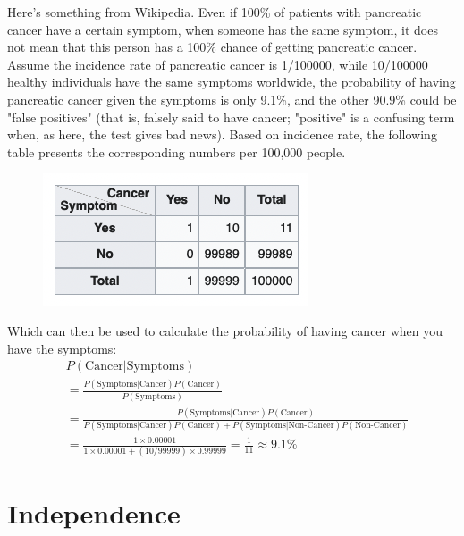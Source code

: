 \begin{example}
   Here's something from Wikipedia.
   Even if 100\% of patients with pancreatic cancer have a certain symptom, when someone has the same symptom, it does not mean that this person has a 100\% 
   chance of getting pancreatic cancer. Assume the incidence rate of pancreatic cancer is 1/100000, 
   while 10/100000 healthy individuals have the same symptoms worldwide, 
   the probability of having pancreatic cancer given the symptoms is only 9.1\%, 
   and the other 90.9\% could be "false positives" (that is, falsely said to have 
   cancer; "positive" is a confusing term when, as here, the test gives bad news).
    Based on incidence rate, the following table presents the corresponding numbers per 100,000 people.
   \begin{figure}[h]
       \centering
       \includegraphics[width=0.4\linewidth]{Figures/cancer}
       \label{fig:cancer}
   \end{figure} 

   Which can then be used to calculate the probability of having cancer when you have the symptoms:
   \begin{align*}
&P(\text{Cancer}|\text{Symptoms})\\ &= \frac{P(\text{Symptoms}|\text{Cancer}) P(\text{Cancer})}{P(\text{Symptoms})} \\
 &= \frac{P(\text{Symptoms}|\text{Cancer}) P(\text{Cancer})}{P(\text{Symptoms}|\text{Cancer}) P(\text{Cancer}) + P(\text{Symptoms}|\text{Non-Cancer}) P(\text{Non-Cancer})} \\[8pt]
&= \frac{1 \times 0.00001}{1 \times 0.00001 + (10/99999) \times 0.99999} = \frac1{11} \approx 9.1\%
\end{align*}
\end{example}

\section{Independence}

